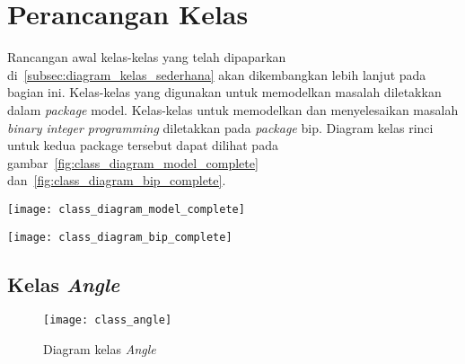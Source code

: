\section{Perancangan Kelas}
Rancangan awal kelas-kelas yang telah dipaparkan di~\ref{subsec:diagram_kelas_sederhana} akan dikembangkan lebih lanjut pada bagian ini. Kelas-kelas yang digunakan untuk memodelkan masalah diletakkan dalam \textit{package} model. Kelas-kelas untuk memodelkan dan menyelesaikan masalah \textit{binary integer programming} diletakkan pada \textit{package} bip. Diagram kelas rinci untuk kedua package tersebut dapat dilihat pada gambar~\ref{fig:class_diagram_model_complete} dan~\ref{fig:class_diagram_bip_complete}.

\begin{sidewaysfigure}
	\centering  
	\texttt{[image: class\_diagram\_model\_complete]}
	\caption[Diagram kelas rinci untuk \textit{package} model]{Diagram kelas rinci untuk \textit{package} model}
	\label{fig:class_diagram_model_complete}
\end{sidewaysfigure}

\begin{sidewaysfigure}
	\centering  
	\texttt{[image: class\_diagram\_bip\_complete]}
	\caption[Diagram kelas rinci untuk \textit{package} bip dan \textit{subpackage} balasadditive]{Diagram kelas rinci untuk \textit{package} bip dan \textit{subpackage} balasadditive}
	\label{fig:class_diagram_bip_complete}
\end{sidewaysfigure}

\subsection{Kelas \textit{Angle}}
\begin{figure}[H]
	\centering  
	\texttt{[image: class\_angle]}
	\caption[Diagram kelas \textit{Angle}]{Diagram kelas \textit{Angle}}
	\label{fig:class_angle}
\end{figure}
	

